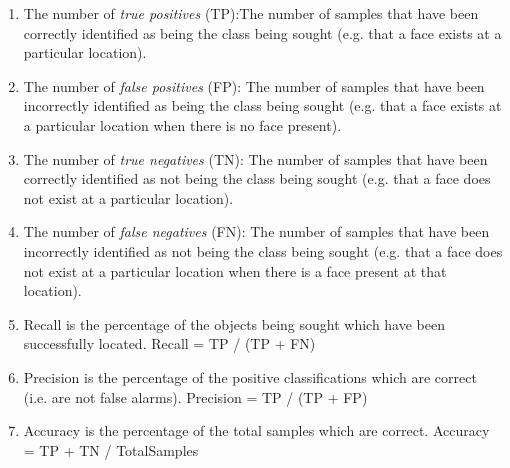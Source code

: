 \begin{enumerate}
\item The number of \textit{true positives} (TP):The number of samples that have been correctly identified as being the class being sought (e.g. that a face exists at a particular location).
\item The number of \textit{false positives} (FP): The number of samples that have been incorrectly identified as being the class being sought (e.g. that a face exists at a particular location when there is no face present).
\item The number of \textit{true negatives} (TN): The number of samples that have been correctly identified as not being the class being sought (e.g. that a face does not exist at a particular location).
\item The number of \textit{false negatives} (FN): The number of samples that have been incorrectly identified as not being the class being sought (e.g. that a face does not exist at a particular location when there is a face present at that location).
\item Recall is the percentage of the objects being sought which have been successfully located. Recall = TP / (TP + FN)
\item Precision is the percentage of the positive classifications which are correct (i.e. are not false alarms). Precision = TP / (TP + FP)
\item Accuracy is the percentage of the total samples which are correct. Accuracy = TP + TN / TotalSamples
\end{enumerate}










